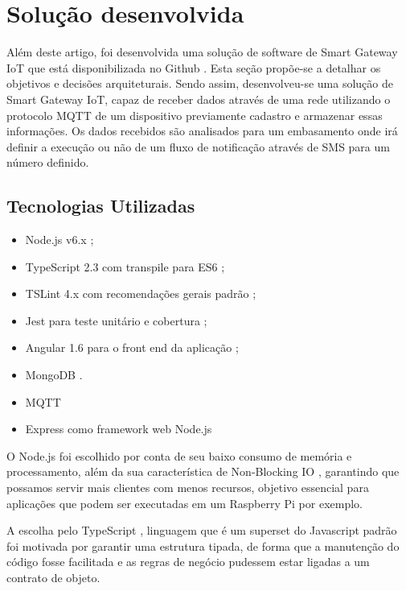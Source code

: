 \section{Solução desenvolvida}
\label{sec:iotGateway}

Além deste artigo, foi desenvolvida uma solução de software de Smart Gateway IoT que está disponibilizada no Github \cite{IoTGatewayGithub}. Esta seção propõe-se a detalhar os objetivos e decisões arquiteturais. Sendo assim, desenvolveu-se uma solução de Smart Gateway IoT, capaz de receber dados através de uma rede utilizando o protocolo MQTT de um dispositivo previamente cadastro e armazenar essas informações. Os dados recebidos são analisados para um embasamento onde irá definir a execução ou não de um fluxo de notificação através de SMS para um número definido.

\subsection{Tecnologias Utilizadas} 
\begin{itemize}
	\item Node.js v6.x \cite{NodeJS};
	\item TypeScript 2.3 com transpile para ES6 \cite{Typescript};
	\item TSLint 4.x com recomendações gerais padrão \cite{TSLint};
	\item Jest para teste unitário e cobertura \cite{Jest};
	\item Angular 1.6 para o front end da aplicação \cite{AngularJS};
	\item MongoDB \cite{MongoDB}.
	\item MQTT \cite{Mqtt}
	\item Express como framework web Node.js \cite{ExpressJS}
\end{itemize}

O Node.js \cite{NodeJS} foi escolhido por conta de seu baixo consumo de memória e processamento, além da sua característica de Non-Blocking IO \cite{NodeJSNonBlockingIO}, garantindo que possamos servir mais clientes com menos recursos, objetivo essencial para aplicações que podem ser executadas em um Raspberry Pi por exemplo.

A escolha pelo TypeScript \cite{Typescript}, linguagem que é um superset do Javascript padrão foi motivada por garantir uma estrutura tipada, de forma que a manutenção do código fosse facilitada e as regras de negócio pudessem estar ligadas a um contrato de objeto.

